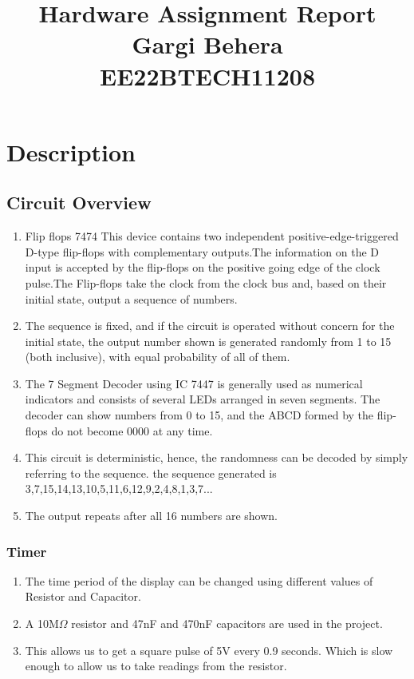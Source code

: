\documentclass{article}
\begin{document}
\title{Hardware Assignment Report\\ \large{Gargi Behera\\EE22BTECH11208}}
\author{}
\date{}
\maketitle

\maketitle

\section*{Description}

\subsection*{Circuit Overview}
\begin{enumerate}
    \item Flip flops 7474 This device contains two independent positive-edge-triggered D-type flip-flops with complementary outputs.The information on the D input is accepted by the flip-flops on the positive going edge of the clock pulse.The Flip-flops take the clock from the clock bus and, based on their initial state, output a sequence of numbers.
    \item The sequence is fixed, and if the circuit is operated without concern for the initial state, the output number shown is generated randomly from 1 to 15 (both inclusive), with equal probability of all of them.
    \item The 7 Segment Decoder using IC 7447 is generally used as numerical indicators and consists of several LEDs arranged in seven segments. The decoder can show numbers from 0 to 15, and the ABCD formed by the flip-flops do not become 0000 at any time.
    \item This circuit is deterministic, hence, the randomness can be decoded by simply referring to the sequence.
    the sequence generated is 3,7,15,14,13,10,5,11,6,12,9,2,4,8,1,3,7...
    \item The output repeats after all 16 numbers are shown. 
\end{enumerate}
\subsubsection*{Timer}
\begin{enumerate}
    \item The time period of the display can be changed using different values of Resistor and Capacitor.
    \item A 10M$\Omega$ resistor and 47nF and 470nF capacitors are used in the project.
    \item This allows us to get a square pulse of 5V every 0.9 seconds. Which is slow enough to allow us to take readings from the resistor.
\end{enumerate}
\end{document}
